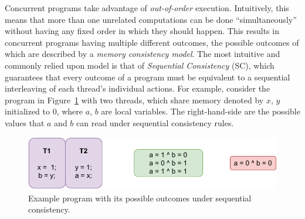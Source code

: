     Concurrent programs take advantage of \textit{out-of-order} execution. Intuitively, this means that more than one unrelated computations can be done ``simultaneously'' without having any fixed order in which they should happen. 
    This results in concurrent programs having multiple different outcomes, the possible outcomes of which are described by
    a \textit{memory consistency model}. 
    The most intuitive and commonly relied upon model is that of \textit{Sequential Consistency} (SC), which guarantees that every outcome of a program must be equivalent to a sequential interleaving of each thread's individual actions. 
    For example, consider the program in Figure~\ref{intro:Example} with two threads, which share memory denoted by $x$, $y$ initialized to 0, where $a$, $b$ are local variables. The right-hand-side are the possible values that $a$ and $b$ can read under sequential consistency rules.
    
    \begin{figure}[H]
        \centering
        \includegraphics[scale=0.7]{1.Introduction/SC_Example1(a).pdf}
        \caption{Example program with its possible outcomes under sequential consistency.}
        \label{intro:Example}
    \end{figure}
    

